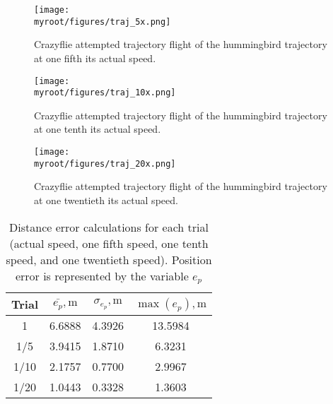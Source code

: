 \documentclass[onecolumn,10pt]{IEEEtran}
\newcommand{\myroot}{../}
\begin{document}
\begin{figure}[p]
\begin{center}
\texttt{[image: \\myroot/figures/traj\_5x.png]}
\end{center}
\caption{Crazyflie attempted trajectory flight of the hummingbird trajectory at one fifth its actual speed.}
\label{fig:onefifthspeed}
\end{figure}

\begin{figure}[p]
\begin{center}
\texttt{[image: \\myroot/figures/traj\_10x.png]}
\end{center}
\caption{Crazyflie attempted trajectory flight of the hummingbird trajectory at one tenth its actual speed.}
\label{fig:onetenthspeed}
\end{figure}

\begin{figure}[p]
\begin{center}
\texttt{[image: \\myroot/figures/traj\_20x.png]}
\end{center}
\caption{Crazyflie attempted trajectory flight of the hummingbird trajectory at one twentieth its actual speed.}
\label{fig:onetwentiethspeed}
\end{figure}

\begin{table}[hb]
\caption{Distance error calculations for each trial (actual speed, one fifth speed, one tenth speed, and one twentieth speed). Position error is represented by the variable $e_p$}
\label{tab:RMSE}
\begin{center}
\begin{tabular}{cccc}
\toprule
Trial & $\bar{e_p}, \si{\meter}$ & $\sigma_{e_p}, \si{\meter}$ & $\max(e_p), \si{\meter}$  \\ %
\midrule
1 & 6.6888 & 4.3926 & 13.5984 \\
1/5 & 3.9415 & 1.8710 & 6.3231 \\
1/10 & 2.1757 & 0.7700 & 2.9967 \\
1/20 & 1.0443 & 0.3328 & 1.3603 \\
\bottomrule
\end{tabular}
\end{center}
\end{table}
\end{document}
